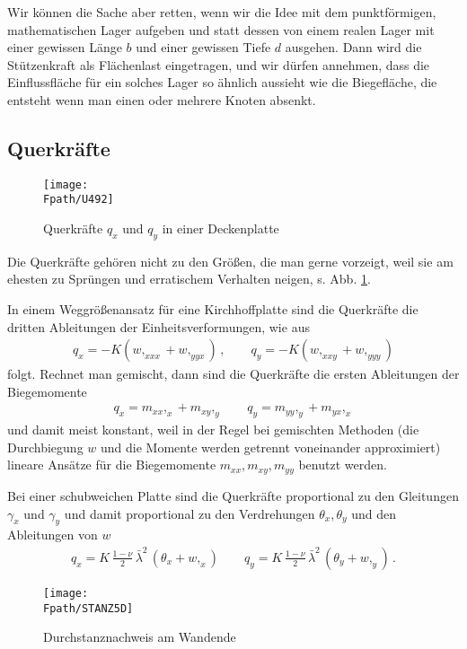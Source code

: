 Wir k\"{o}nnen die Sache aber retten, wenn wir die Idee mit dem punktf\"{o}rmigen, mathematischen Lager aufgeben und statt dessen von einem realen Lager mit einer gewissen L\"{a}nge $b$ und einer gewissen Tiefe $d$ ausgehen. Dann wird die St\"{u}tzenkraft als Fl\"{a}chenlast eingetragen, und wir d\"{u}rfen annehmen, dass die Einflussfl\"{a}che f\"{u}r ein solches Lager so \"{a}hnlich aussieht wie die Biegefl\"{a}che, die entsteht wenn man einen oder mehrere Knoten absenkt.

{\textcolor{sectionTitleBlue}{\section{Querkr\"{a}fte}}}\label{Querkraefte}
\begin{figure}[tbp]
\centering
\if {} \sidecaption \fi
\texttt{[image: \\Fpath/U492]}
\caption{Querkr\"{a}fte $q_x$ und $q_y$ in einer Deckenplatte} \label{U492}
\end{figure}%
Die Querkr\"{a}fte geh\"{o}ren nicht zu den Gr\"{o}{\ss}en, die man gerne vorzeigt, weil sie am ehesten
zu Spr\"{u}ngen und erratischem Verhalten neigen, s. Abb. \ref{U492}.

In einem Weggr\"{o}{\ss}enansatz f\"{u}r eine Kirchhoffplatte sind die Querkr\"{a}fte die dritten Ableitungen der Einheitsverformungen, wie aus
\begin{align}
q_x = - K(w,_{xxx} + w,_{yyx})\,, \qquad q_y = - K(w,_{xxy} + w,_{yyy})
\end{align}
folgt. Rechnet man gemischt, dann sind die Querkr\"{a}fte die ersten Ableitungen der
Biegemomente
\begin{align}
q_x = m_{xx},_x + m_{xy},_y  \qquad q_y = m_{yy},_y + m_{yx},_x
\end{align}
und damit meist konstant, weil in der Regel bei gemischten Methoden (die Durchbiegung $w$ und die Momente werden getrennt voneinander approximiert) lineare Ans\"{a}tze f\"{u}r die Biegemomente $m_{xx}, m_{xy}, m_{yy}$ benutzt werden.

Bei einer schubweichen Platte sind die Querkr\"{a}fte proportional zu den Gleitungen $\gamma_x$ und $\gamma_y$ und damit proportional zu den Verdrehungen $\theta_x, \theta_y$ und den Ableitungen von $w$
\begin{align}
q_x = K \,\frac{1 - \nu}{2}\, \bar{\lambda}^2\, (\theta_x + w,_x) \qquad q_y = K\,
\frac{1 - \nu}{2}\, \bar{\lambda}^2\, (\theta_y + w,_y) \,.
\end{align}
\begin{figure}[tbp]
\centering
\if {} \sidecaption \fi
\texttt{[image: \\Fpath/STANZ5D]}
\caption{Durchstanznachweis am Wandende} \label{Stanz5}
\end{figure}%

